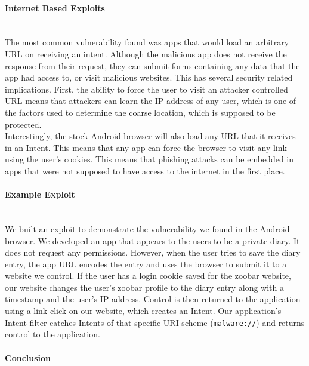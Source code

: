 \documentclass[12pt,a4paper]{article}
\begin{document}
\paragraph{Internet Based Exploits} ~\\ 
The most common vulnerability found was apps that would load an arbitrary URL on
receiving an intent. Although the malicious app does not receive the response
from their request, they can submit forms containing any data that the app had
access to, or visit malicious websites. This has several security related
implications. First, the ability to force the user to visit an attacker
controlled URL means that attackers can learn the IP address of any user, which
is one of the factors used to determine the coarse location, which is supposed
to be protected.  \\ 
Interestingly, the stock Android browser will also load any URL that it receives
in an Intent. This means that any app can force the browser to visit any link
using the user's cookies. This means that phishing attacks can be embedded in
apps that were not supposed to have access to the internet in the first place.

\paragraph{Example Exploit} ~\\
We built an exploit to demonstrate the vulnerability we found in the Android
browser. We developed an app that appears to the users to be a private diary. It
does not request any permissions. However, when the user tries to save the diary
entry, the app URL encodes the entry and uses the browser to submit it to a
website we control. If the user has a login cookie saved for the zoobar website,
our website changes the user's zoobar profile to the diary entry along with a
timestamp and the user's IP address. Control is then returned to the application
using a link click on our website, which creates an Intent. Our application's
Intent filter catches Intents of that specific URI scheme (\texttt{malware://})
and returns control to the application.

\paragraph{Conclusion} ~\\

 
\end{document}
